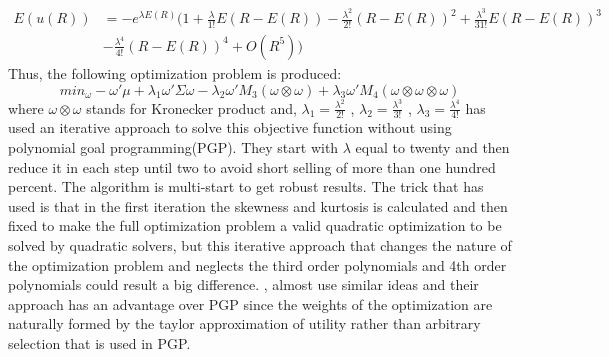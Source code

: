 \documentclass[12pt,a4paper]{article}
\numberwithin{equation}{section}
\begin{document}
\begin{equation}
\begin{split}
E(u(R))&=-e^{\lambda E(R)}(1+\frac{\lambda}{1!}E(R-E(R))-\frac{\lambda^2}{2!}(R-E(R))^2 +\frac{\lambda^3}{31!}E(R-E(R))^3  \\
&-\frac{\lambda^4}{4!}(R-E(R))^4+O(R^5)  )  
\end{split}
\end{equation}
Thus, the following optimization problem is produced:
 \begin{equation}
min_{\omega} -\omega'\mu+\lambda_1 \omega' \Sigma \omega-\lambda_2\omega'M_3 (\omega \otimes \omega) +\lambda_3 \omega' M_4(\omega \otimes \omega \otimes \omega)
\end{equation}
where   $\omega \otimes \omega$   stands for Kronecker product and, $\lambda_1=\frac{\lambda^2}{2!} $   , $\lambda_2=\frac{\lambda^3}{3!}$ , $\lambda_3=\frac{\lambda^4}{4!}$ 
\citep{Glawischnig2013} has used an iterative approach to solve this objective function without using polynomial goal programming(PGP). They start with $\lambda$ equal to twenty and then reduce it in each step until two to avoid short selling of more than one hundred percent. The algorithm is multi-start to get robust results. The trick that \citep{Glawischnig2013} has used is that in the first iteration the skewness and kurtosis is calculated and then fixed to make the full optimization problem a valid quadratic optimization to be solved by quadratic solvers, but this iterative approach that changes the nature of the optimization problem and neglects the third order polynomials and 4th order polynomials could result a big difference. \citep{Glawischnig2013},\citep{Jondeau2006} almost use similar ideas and their approach has an advantage over PGP since the weights of the optimization are naturally formed by the taylor approximation of utility rather than arbitrary selection that is used in PGP. 
\end{document}
